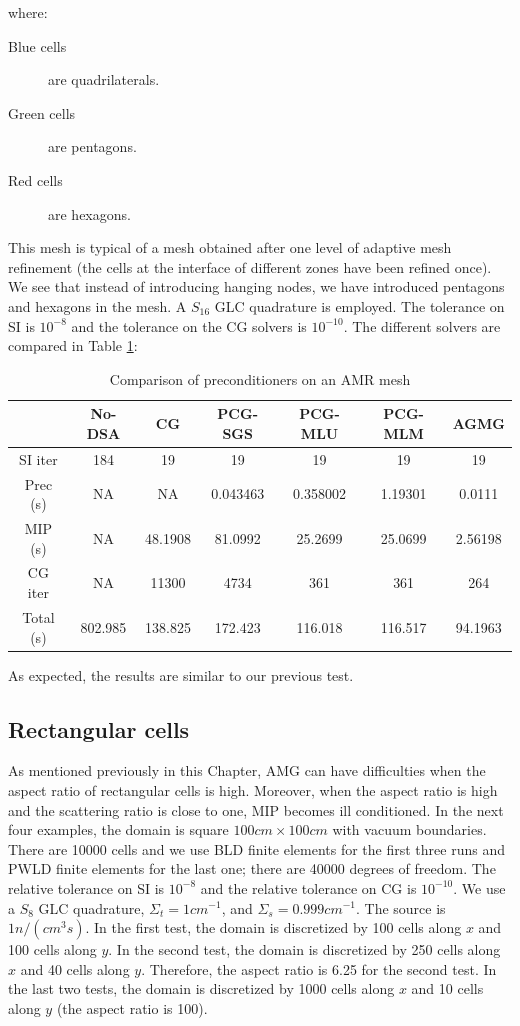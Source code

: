 where:
\begin{description}
  \item[Blue cells] are quadrilaterals.
  \item[Green cells] are pentagons.
  \item[Red cells] are hexagons.
\end{description}
This mesh is typical of a mesh obtained after one level of adaptive mesh
refinement (the cells at the interface of different zones have been refined
once). We see that instead of introducing hanging nodes, we have introduced
pentagons and hexagons in the mesh.
A $S_{16}$ GLC quadrature is employed. The tolerance on SI is $10^{-8}$ and
the tolerance on the CG solvers is $10^{-10}$.
The different solvers are compared in Table \ref{tab_6}:
\begin{table}[H]
  \caption{Comparison of preconditioners on an AMR mesh}
  \begin{center}
    \begin{tabular}{|c|c|c|c|c|c|c|}
      \hline
       & No-DSA & CG & PCG-SGS & PCG-MLU & PCG-MLM & AGMG \\
      \hline
      SI iter    & 184     & 19      & 19       & 19      & 19       & 19 \\
      Prec (s)   & NA      & NA      & 0.043463 & 0.358002 & 1.19301 & 0.0111\\
      MIP (s)    & NA      & 48.1908 & 81.0992  & 25.2699 & 25.0699  & 
      2.56198\\
      CG iter    & NA      & 11300   & 4734     & 361     & 361      & 264 \\
      Total (s)  & 802.985 & 138.825 & 172.423  & 116.018 & 116.517  &
      94.1963\\
      \hline
    \end{tabular}
    \label{tab_6}
  \end{center}
\end{table}
As expected, the results are similar to our previous test.

\subsection{Rectangular cells}
As mentioned previously in this Chapter, AMG can have difficulties when the
aspect ratio of rectangular cells is high. Moreover, when the aspect ratio is
high and the scattering ratio is close to one, MIP becomes ill conditioned. 
In the next four examples, the domain is square $100cm \times 100cm$ with vacuum 
boundaries. There are 10000 cells and we use BLD finite elements for the first
three runs and PWLD finite elements for the last one; 
there are 40000 degrees of freedom. The relative tolerance on SI is $10^{-8}$ 
and the relative tolerance on CG is $10^{-10}$. We use a $S_{8}$ GLC quadrature, 
$\Sigma_t = 1 cm^{-1}$, and $\Sigma_s = 0.999 cm^{-1}$. The source is
$1n/(cm^3s)$. In the first test, the domain is discretized by 100 cells along
$x$ and 100 cells along $y$. In the second test, the domain is discretized by
250 cells along $x$ and 40 cells along $y$. Therefore, the aspect ratio is 6.25
for the second test. In the last two tests, the domain is discretized by 1000
cells along $x$ and 10 cells along $y$ (the aspect ratio is 100).

